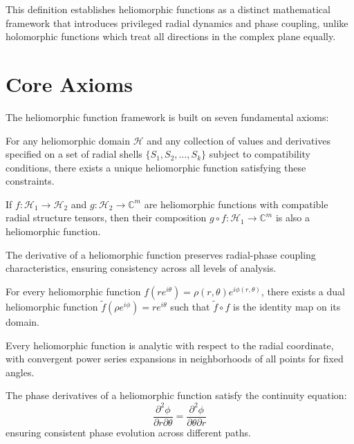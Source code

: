 This definition establishes heliomorphic functions as a distinct mathematical framework that introduces privileged radial dynamics and phase coupling, unlike holomorphic functions which treat all directions in the complex plane equally.

\section{Core Axioms}

The heliomorphic function framework is built on seven fundamental axioms:

\begin{axiom}
For any heliomorphic domain $\mathcal{H}$ and any collection of values and derivatives specified on a set of radial shells $\{S_1, S_2, \ldots, S_k\}$ subject to compatibility conditions, there exists a unique heliomorphic function satisfying these constraints.
\end{axiom}

\begin{axiom}
If $f: \mathcal{H}_1 \rightarrow \mathcal{H}_2$ and $g: \mathcal{H}_2 \rightarrow \mathbb{C}^m$ are heliomorphic functions with compatible radial structure tensors, then their composition $g \circ f: \mathcal{H}_1 \rightarrow \mathbb{C}^m$ is also a heliomorphic function.
\end{axiom}

\begin{axiom}
The derivative of a heliomorphic function preserves radial-phase coupling characteristics, ensuring consistency across all levels of analysis.
\end{axiom}

\begin{axiom}
For every heliomorphic function $f(re^{i\theta}) = \rho(r,\theta)e^{i\phi(r,\theta)}$, there exists a dual heliomorphic function $\tilde{f}(\rho e^{i\phi}) = re^{i\theta}$ such that $\tilde{f} \circ f$ is the identity map on its domain.
\end{axiom}

\begin{axiom}
Every heliomorphic function is analytic with respect to the radial coordinate, with convergent power series expansions in neighborhoods of all points for fixed angles.
\end{axiom}

\begin{axiom}
The phase derivatives of a heliomorphic function satisfy the continuity equation:
\begin{equation}
\frac{\partial^2 \phi}{\partial r \partial \theta} = \frac{\partial^2 \phi}{\partial \theta \partial r}
\end{equation}
ensuring consistent phase evolution across different paths.
\end{axiom}

